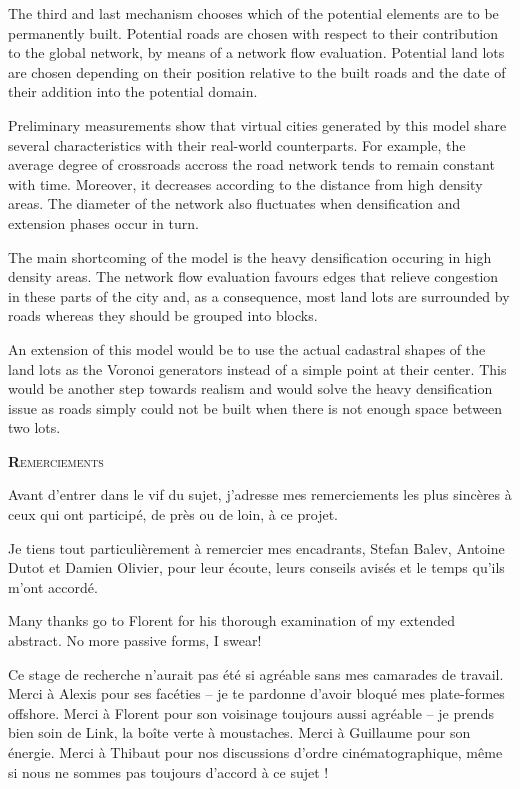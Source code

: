 \documentclass[10pt]{article}
\begin{document}
The third and last mechanism chooses which of the potential elements
are to be permanently built. Potential roads are chosen with respect
to their contribution to the global network, by means of a network
flow evaluation. Potential land lots are chosen depending on their
position relative to the built roads and the date of their addition
into the potential domain.

Preliminary measurements show that virtual cities generated by this
model share several characteristics with their real-world
counterparts. For example, the average degree of crossroads accross
the road network tends to remain constant with time. Moreover, it
decreases according to the distance from high density areas. The
diameter of the network also fluctuates when densification and
extension phases occur in turn.

The main shortcoming of the model is the heavy densification occuring
in high density areas. The network flow evaluation favours edges that
relieve congestion in these parts of the city and, as a consequence,
most land lots are surrounded by roads whereas they should be grouped
into blocks.

An extension of this model would be to use the actual cadastral shapes
of the land lots as the Voronoi generators instead of a simple point
at their center. This would be another step towards realism and would
solve the heavy densification issue as roads simply could not be built
when there is not enough space between two lots.

\newpage

\tableofcontents

\newpage

\begin{center}
  {\scshape\textbf Remerciements}
\end{center}

Avant d'entrer dans le vif du sujet, j'adresse mes remerciements les
plus sincères à ceux qui ont participé, de près ou de loin, à ce
projet.

Je tiens tout particulièrement à remercier mes encadrants, Stefan
Balev, Antoine Dutot et Damien Olivier, pour leur écoute, leurs
conseils avisés et le temps qu'ils m'ont accordé.

Many thanks go to Florent for his thorough examination of my extended
abstract. No more passive forms, I swear!

Ce stage de recherche n'aurait pas été si agréable sans mes camarades
de travail. Merci à Alexis pour ses facéties -- je te pardonne d'avoir
bloqué mes plate-formes offshore. Merci à Florent pour son voisinage
toujours aussi agréable -- je prends bien soin de Link, la boîte verte
à moustaches. Merci à Guillaume pour son énergie. Merci à Thibaut pour
nos discussions d'ordre cinématographique, même si nous ne sommes pas
toujours d'accord à ce sujet !
\end{document}
